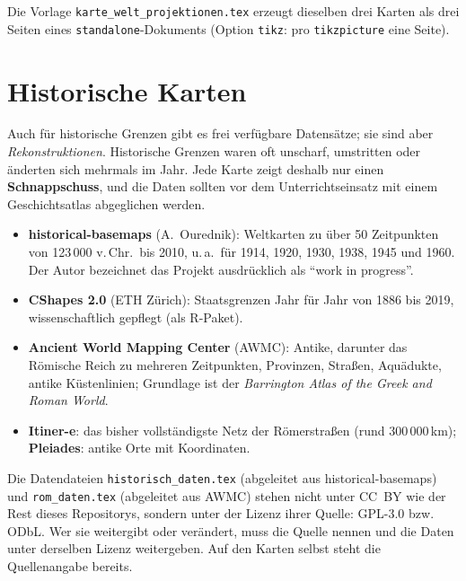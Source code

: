 Die Vorlage \texttt{karte\_welt\_projektionen.tex} erzeugt dieselben drei Karten als drei Seiten eines \texttt{standalone}-Dokuments (Option \texttt{tikz}: pro \texttt{tikzpicture} eine Seite).



\section{Historische Karten}\label{sec:geschichte}

Auch für historische Grenzen gibt es frei verfügbare Datensätze; sie sind aber \textit{Rekonstruktionen}. Historische Grenzen waren oft unscharf, umstritten oder änderten sich mehrmals im Jahr. Jede Karte zeigt deshalb nur einen \textbf{Schnappschuss}, und die Daten sollten vor dem Unterrichtseinsatz mit einem Geschichtsatlas abgeglichen werden.

\begin{itemize}
	\item \textbf{historical-basemaps} (A.~Ourednik): Weltkarten zu über 50 Zeitpunkten von 123\,000 v.\,Chr.\ bis 2010, u.\,a.\ für 1914, 1920, 1930, 1938, 1945 und 1960. Der Autor bezeichnet das Projekt ausdrücklich als \enquote{work in progress}.
	\item \textbf{CShapes 2.0} (ETH Zürich): Staatsgrenzen Jahr für Jahr von 1886 bis 2019, wissenschaftlich gepflegt (als R-Paket).
	\item \textbf{Ancient World Mapping Center} (AWMC): Antike, darunter das Römische Reich zu mehreren Zeitpunkten, Provinzen, Straßen, Aquädukte, antike Küstenlinien; Grundlage ist der \textit{Barrington Atlas of the Greek and Roman World}.
	\item \textbf{Itiner-e}: das bisher vollständigste Netz der Römerstraßen (rund 300\,000\,km); \textbf{Pleiades}: antike Orte mit Koordinaten.
\end{itemize}

\begin{hinweis}
	Die Datendateien \texttt{historisch\_daten.tex} (abgeleitet aus historical-basemaps) und \texttt{rom\_daten.tex} (abgeleitet aus AWMC) stehen nicht unter CC~BY wie der Rest dieses Repositorys, sondern unter der Lizenz ihrer Quelle: GPL-3.0 bzw. ODbL. Wer sie weitergibt oder verändert, muss die Quelle nennen und die Daten unter derselben Lizenz weitergeben. Auf den Karten selbst steht die Quellenangabe bereits.
\end{hinweis}


